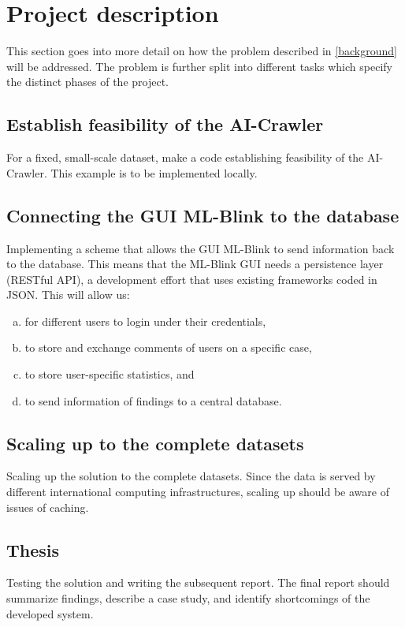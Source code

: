 \section{Project description} \label{description}

This section goes into more detail on how the problem described in \ref{background} will be addressed. The problem is further split into different tasks which specify the distinct phases of the project. 

\subsection{Establish feasibility of the AI-Crawler}

For a fixed, small-scale dataset, make a code establishing feasibility of the AI-Crawler. This example is to be implemented locally.

\subsection{Connecting the GUI ML-Blink to the database}

Implementing a scheme that allows the GUI ML-Blink to send information back to the database. This means that the ML-Blink GUI needs a persistence layer (RESTful API), a development effort that uses existing frameworks coded in JSON.  This will allow us:

\begin{enumerate}[(a)]
  \item for different users to login under their credentials,
  \item to store and exchange comments of users on a specific case,
  \item to store user-specific statistics, and
  \item to send information of findings to a central database.
\end{enumerate}

\subsection{Scaling up to the complete datasets}

Scaling up the solution to the complete datasets. Since the data is served by different international computing infrastructures, scaling up should be aware of issues of caching.
 
\subsection{Thesis}

Testing the solution and writing the subsequent report. The final report should summarize findings, describe a case study, and identify shortcomings of the developed system.